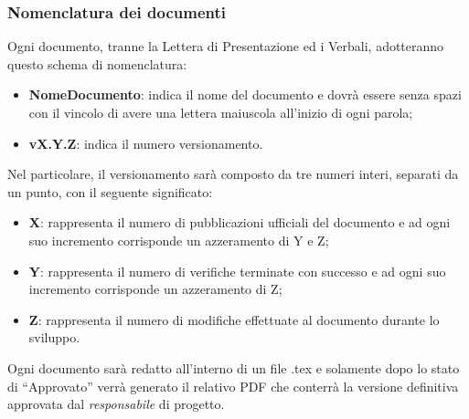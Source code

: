 \subsubsection{Nomenclatura dei documenti}
Ogni documento, tranne la Lettera di Presentazione ed i Verbali, adotteranno questo schema di nomenclatura:
\begin{itemize}
    \item \textbf{NomeDocumento}: indica il nome del documento e dovrà essere senza spazi con il vincolo di avere una lettera maiuscola all’inizio di ogni parola;
    \item \textbf{vX.Y.Z}: indica il numero versionamento.
\end{itemize}
Nel particolare, il versionamento sarà composto da tre numeri interi, separati da un punto, con il seguente significato:
\begin{itemize}
    \item \textbf{X}: rappresenta il numero di pubblicazioni ufficiali del documento e ad ogni suo incremento corrisponde un azzeramento di Y e Z;
    \item \textbf{Y}: rappresenta il numero di verifiche terminate con successo e ad ogni suo incremento corrisponde un azzeramento di Z;
    \item \textbf{Z}: rappresenta il numero di modifiche effettuate al documento durante lo sviluppo.
\end{itemize}
Ogni documento sarà redatto all’interno di un file .tex e solamente dopo lo stato di “Approvato” verrà generato il relativo PDF che conterrà la versione definitiva approvata dal \emph{responsabile} di progetto.

